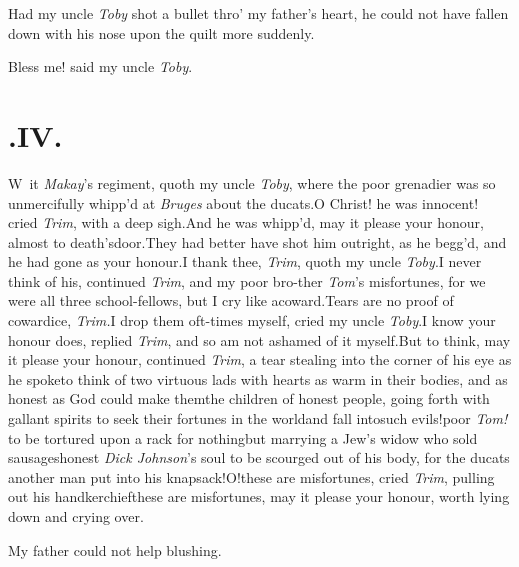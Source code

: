 \documentclass{article}
\begin{document}
\tsh Had my uncle \textit{Toby} shot a bullet thro’ my
father’s heart, he could not have fallen down with his nose
upon the quilt more suddenly.

Bless me! said my uncle \textit{Toby}.

\bigskip
\section{.\enspace IV.}

\lettrine{W}{\,} it \textit{Makay}’s regiment, quoth\break
my uncle \textit{Toby}, where the poor\break
grenadier was so unmercifully whipp’d at \textit{Bruges}
about the ducats.\tsk O Christ! he was innocent! cried
\textit{Trim}, with a deep sigh.\tsk And he was whipp’d, may
it please your honour, almost to death’s\pb door.\tsk They had
better have shot him outright, as he begg’d, and he had gone
as your honour.\tsh I thank thee, \textit{Trim}, quoth my uncle
\textit{Toby}.\tsh I never think of his, continued
\textit{Trim}, and my poor bro-\break ther \textit{Tom}’s
misfortunes, for we were all three school-fellows, but I cry
like a\break coward.\tsh Tears are no proof of cowardice,
\textit{Trim.}\tsk I drop them oft-times myself, cried my
uncle \textit{Toby}.\tsh I know your honour does, replied
\textit{Trim}, and so am not ashamed of it myself.\tsk But
to think, may it please your honour, continued
\textit{Trim}, a tear stealing into the corner of his eye as
he spoke\tsk to think of two virtuous lads with hearts as
warm in their bodies, and as honest as God could make
them\tsk the children of honest people, going forth with
gallant spirits to seek their fortunes in the world\tsk and
fall into\pb such evils!\tsk poor \textit{Tom!} to be tortured
upon a rack for nothing\tsk but marrying a Jew’s widow who
sold sausages\tsk honest \textit{Dick Johnson}’s soul to be
scourged out of his body, for the ducats another man put
into his knapsack!\tsk O!\tsk these are misfortunes, cried
\textit{Trim}, pulling out his handkerchief\tsk these
are misfortunes, may it please your honour, worth lying down
and crying over.


\tsk My father could not help blushing.
\end{document}
